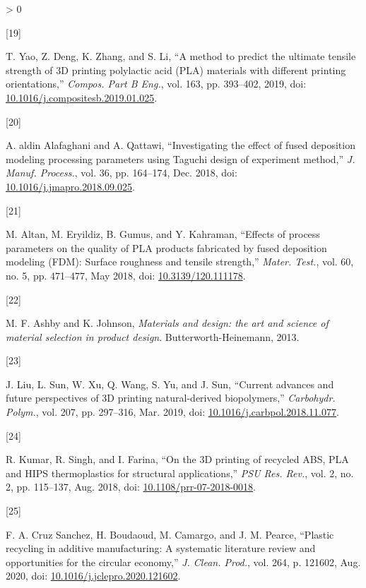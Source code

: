 \documentclass[conference,final,]{IEEEtran}
\newlength{\csllabelwidth}
\newlength{\cslhangindent}
\newenvironment{CSLReferences}[3] %
 {%
  \setlength{\parindent}{0pt}
  \ifodd #1 \everypar{\setlength{\hangindent}{\cslhangindent}}\ignorespaces\fi
  \ifnum #2 > 0
  \setlength{\parskip}{#2\baselineskip}
  \fi
 }%
 {}
\newcommand{\CSLLeftMargin}[1]{\parbox[t]{\csllabelwidth}{#1}}
\newcommand{\CSLRightInline}[1]{\parbox[t]{\linewidth - \csllabelwidth}{#1}}
\begin{document}
\begin{CSLReferences}{0}{0}
\leavevmode\hypertarget{ref-Yao2019}{}%
\CSLLeftMargin{{[}19{]} }
\CSLRightInline{T. Yao, Z. Deng, K. Zhang, and S. Li, {``{A method to
predict the ultimate tensile strength of 3D printing polylactic acid
(PLA) materials with different printing orientations},''} \emph{Compos.
Part B Eng.}, vol. 163, pp. 393--402, 2019, doi:
\href{https://doi.org/10.1016/j.compositesb.2019.01.025}{10.1016/j.compositesb.2019.01.025}.}

\leavevmode\hypertarget{ref-Alafaghani2018}{}%
\CSLLeftMargin{{[}20{]} }
\CSLRightInline{A. aldin Alafaghani and A. Qattawi, {``{Investigating
the effect of fused deposition modeling processing parameters using
Taguchi design of experiment method},''} \emph{J. Manuf. Process.}, vol.
36, pp. 164--174, Dec. 2018, doi:
\href{https://doi.org/10.1016/j.jmapro.2018.09.025}{10.1016/j.jmapro.2018.09.025}.}

\leavevmode\hypertarget{ref-Altan2018}{}%
\CSLLeftMargin{{[}21{]} }
\CSLRightInline{M. Altan, M. Eryildiz, B. Gumus, and Y. Kahraman,
{``{Effects of process parameters on the quality of PLA products
fabricated by fused deposition modeling (FDM): Surface roughness and
tensile strength},''} \emph{Mater. Test.}, vol. 60, no. 5, pp. 471--477,
May 2018, doi:
\href{https://doi.org/10.3139/120.111178}{10.3139/120.111178}.}

\leavevmode\hypertarget{ref-Ashby2013}{}%
\CSLLeftMargin{{[}22{]} }
\CSLRightInline{M. F. Ashby and K. Johnson, \emph{{Materials and design:
the art and science of material selection in product design}}.
Butterworth-Heinemann, 2013.}

\leavevmode\hypertarget{ref-Liu2019a}{}%
\CSLLeftMargin{{[}23{]} }
\CSLRightInline{J. Liu, L. Sun, W. Xu, Q. Wang, S. Yu, and J. Sun,
{``{Current advances and future perspectives of 3D printing
natural-derived biopolymers},''} \emph{Carbohydr. Polym.}, vol. 207, pp.
297--316, Mar. 2019, doi:
\href{https://doi.org/10.1016/j.carbpol.2018.11.077}{10.1016/j.carbpol.2018.11.077}.}

\leavevmode\hypertarget{ref-Kumar2018b}{}%
\CSLLeftMargin{{[}24{]} }
\CSLRightInline{R. Kumar, R. Singh, and I. Farina, {``{On the 3D
printing of recycled ABS, PLA and HIPS thermoplastics for structural
applications},''} \emph{PSU Res. Rev.}, vol. 2, no. 2, pp. 115--137,
Aug. 2018, doi:
\href{https://doi.org/10.1108/prr-07-2018-0018}{10.1108/prr-07-2018-0018}.}

\leavevmode\hypertarget{ref-CruzSanchez2020}{}%
\CSLLeftMargin{{[}25{]} }
\CSLRightInline{F. A. Cruz Sanchez, H. Boudaoud, M. Camargo, and J. M.
Pearce, {``{Plastic recycling in additive manufacturing: A systematic
literature review and opportunities for the circular economy},''}
\emph{J. Clean. Prod.}, vol. 264, p. 121602, Aug. 2020, doi:
\href{https://doi.org/10.1016/j.jclepro.2020.121602}{10.1016/j.jclepro.2020.121602}.}


\end{CSLReferences}
\end{document}
